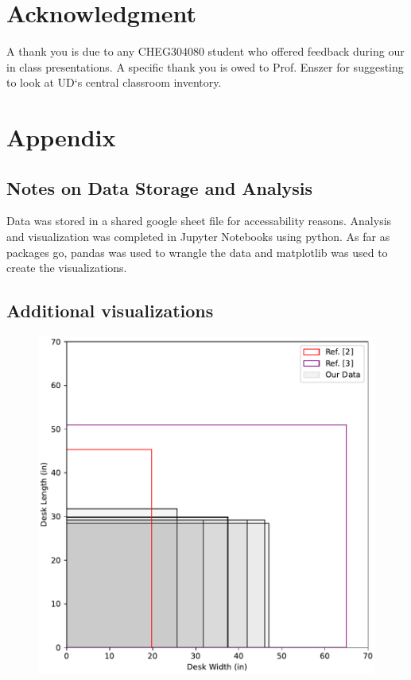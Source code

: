 \documentclass[conference]{IEEEtran}
\begin{document}
\section*{Acknowledgment}

A thank you is due to any CHEG304080 student who offered feedback during our in class presentations. A specific thank you is owed to Prof. Enszer for suggesting to look at UD`s central classroom inventory.

   



\section*{Appendix}

\subsection{Notes on Data Storage and Analysis}

Data was stored in a shared google sheet file for accessability reasons. Analysis and visualization was completed in Jupyter Notebooks using python. As far as packages go, pandas was used to wrangle the data and matplotlib was used to create the visualizations. 

\subsection{Additional visualizations}

\begin{figure}[H]
    \includegraphics[width=\linewidth]{vis/rectangles.pdf}
\end{figure}
\end{document}
